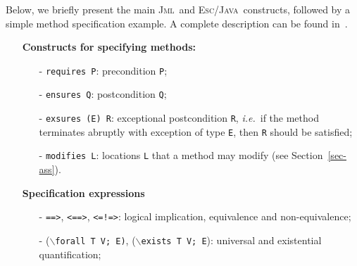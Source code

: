\documentclass[a4paper]{llncs}
\newcommand{\jml}{\textsc{Jml}}
\newcommand{\escj}{\textsc{Esc/Java}}
\begin{document}
Below, we briefly present the main \jml\ and \escj\ constructs,
followed by a simple method specification example. A complete
description can be found in~\cite{LeavensBR00,LeinoNS00}.
\begin{itemize}
\item[] \textbf{Constructs for specifying methods:} 
\begin{itemize}
\item[-]{\texttt{requires P}: precondition {\tt P};}
 
\item[-]{\texttt{ensures Q}: postcondition {\tt Q};} 
 
\item[-]{\texttt{exsures (E) R}: exceptional postcondition \texttt{R},
\emph{i.e.}~if the method terminates abruptly with exception of type
\texttt{E}, then \texttt{R} should be satisfied; }

\item[-]{\texttt{modifies L}: locations \texttt{L} that
a method may modify (see Section~\ref{sec-ass}).}
 
\end{itemize}
 
\item[] \textbf{Specification expressions}  
 
\begin{itemize} 
\item[-]{\texttt{==>}, \texttt{<==>}, \texttt{<=!=>}}: logical
implication, equivalence and non-equivalence;
 
\item[-] {($\backslash$\texttt{forall T V; E)}, 
($\backslash$\texttt{exists T V; E})}: universal and existential
quantification;
 

\end{itemize}
\end{itemize}
\end{document}
